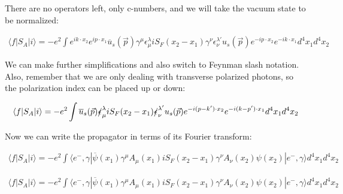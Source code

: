\documentclass[a4]{article}
\begin{document}
\begin{framed}
            There are no operators left, only c-numbers, and we will take the vacuum state to be normalized:

            \begin{equation}
                \begin{aligned}
                    \langle f | S_{A} | i \rangle = - e^{2} \int e^{i k \cdot x_2} e^{i p \cdot x_1} \overline{u}_{s} (\vec{p}) \gamma^{\mu} \epsilon_{\mu}^{\lambda} i S_{F} (x_2 - x_1) \gamma^{\nu} \epsilon_{\nu}^{\lambda'} u_{s} (\vec{p}) e^{- i p \cdot x_2} e^{- i k \cdot x_1} d^{4} x_{1} d^{4} x_{2}
                \end{aligned}
            \end{equation}

            We can make further simplifications and also switch to Feynman slash notation. Also, remember that we are only dealing with transverse polarized photons,
            so the polarization index can be placed up or down:

            \begin{equation}
                \begin{aligned}
                    \langle f | S_{A} | i \rangle = - e^{2} \int \overline{u}_{s} (\vec{p}) \slashed{\epsilon}_{\mu}^{\lambda} i S_{F} (x_2 - x_1) \slashed{\epsilon}_{\nu}^{\lambda'} u_{s} (\vec{p}) e^{- i (p - k') \cdot x_2} e^{- i (k- p') \cdot x_1} d^{4} x_{1} d^{4} x_{2}
                \end{aligned}
            \end{equation}

            Now we can write the propagator in terms of its Fourier transform:

            \begin{equation}
                \begin{aligned}
                    \langle f | S_{A} | i \rangle = - e^{2} \int \langle e^{-}, \gamma |\overline{\psi} (x_1) \gamma^{\mu} A_{\mu} (x_1) i S_{F} (x_2 - x_1) \gamma^{\nu} A_{\nu} (x_2) \psi (x_2)| e^{-}, \gamma \rangle d^{4} x_{1} d^{4} x_{2}
                \end{aligned}
            \end{equation}

            \begin{equation}
                \begin{aligned}
                    \langle f | S_{A} | i \rangle = - e^{2} \int \langle e^{-}, \gamma |\overline{\psi} (x_1) \gamma^{\mu} A_{\mu} (x_1) i S_{F} (x_2 - x_1) \gamma^{\nu} A_{\nu} (x_2) \psi (x_2)| e^{-}, \gamma \rangle d^{4} x_{1} d^{4} x_{2}
                \end{aligned}
            \end{equation}


\end{framed}
\end{document}
